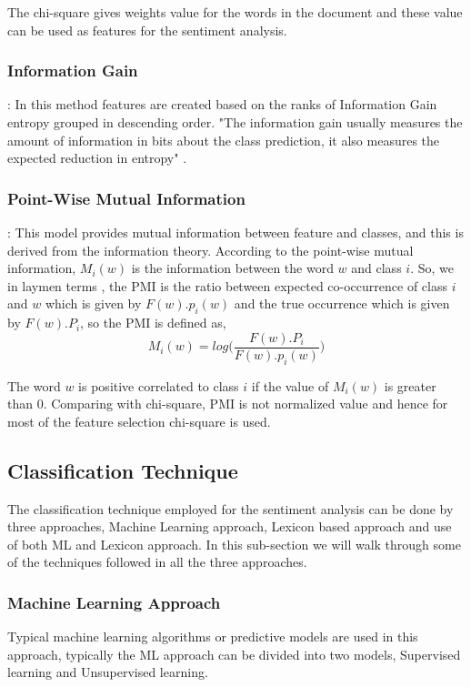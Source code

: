 \documentclass[sigconf]{acmart}
\begin{document}
The chi-square gives weights value for the words in the document and these value can be used as features for the sentiment analysis.

\subsubsection*{Information Gain} : In this method features are created based on the ranks of Information Gain entropy grouped in descending order. "The information gain usually measures the amount of information in bits about the class prediction, it also measures the expected reduction in entropy" \cite{Duch2006}.

\subsubsection*{Point-Wise Mutual Information} : This model provides mutual information between feature and classes, and this is derived from the information theory. According to \cite{sentianalysis} the point-wise mutual information, $M_i(w)$ is the information between the word $w$ and class $i$. So, we in laymen terms , the 
PMI \cite{sentianalysis} is the ratio between expected co-occurrence of class $i$ and $w$ which is given by $F(w).p_i(w)$ and the true occurrence which is given by $F(w).P_i$, so the PMI is defined as,
$$M_i(w) = log\bigg(\frac{F(w).P_i}{F(w).p_i(w)}\bigg)$$

The word $w$ is positive correlated to class $i$ if the value of $M_i(w)$ is greater than 0. Comparing with chi-square, PMI is not normalized value and hence for most of the feature selection chi-square is used.

\subsection{Classification Technique}

The classification technique employed for the sentiment analysis can be done by three approaches, Machine Learning approach, Lexicon based approach and use of both ML and Lexicon approach. In this sub-section we will walk through some of the techniques followed in all the three approaches.

\subsubsection{Machine Learning Approach}
Typical machine learning algorithms or predictive models are used in this approach, typically the ML approach can be divided into two models, Supervised learning and Unsupervised learning. 
\end{document}
